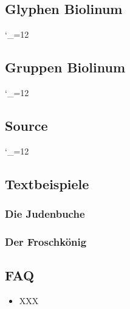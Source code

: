 \documentclass{fontdoku}
\begin{document}
\newpage
\subsection{Glyphen Biolinum}

{%
\setlength{\columnseprule}{.5pt}
\setlength{\columnsep}{1cm}
\begin{multicols}{3}
   \newcommand{\GYLPHNAME}[1]{\sindex[Bglyph]{#1}%
   \makebox[3cm][l]{\hypertarget{bglyph.#1}{}\hyperlink{bgglyph.#1}{#1}}\hfill%
   {\Huge\fbox{\Bglyph{#1}\strut}}\hfill\mbox{}\newline}
   \catcode`\_=12%
\end{multicols}
}


\newpage
\subsection{Gruppen Biolinum}
{\setlength{\columnseprule}{.5pt}
\setlength{\columnsep}{1cm}
\catcode`\_=12%
\newcommand{\GROUPHEAD}[1]{\begin{multicols}{3}[\subsubsection{#1}]}
\newcommand{\GROUPFOOT}{\end{multicols}}
\newcommand{\GROUPGLYPH}[2]{\sindex[Bglyph]{#2}%
   \makebox[3cm][l]{\hyperlink{bglyph.#2}{#2}\hypertarget{bgglyph.#2}{}{ \small(0x#1)}}%
   \hfill{\Huge\Bglyph{#2}\strut}\hfill\mbox{}\newline}
}



\newpage
\subsection{Source}



\newpage
{}
%
{\catcode`\_=12%
\def\indexcolumn{4}%
\printindex[Lglyph]
\printindex[Bglyph]
}
\printindex[idx]

\newpage
\subsection{Textbeispiele}

\subsubsection{Die Judenbuche}
{\color[HTML]{8c0b0b}

}
\newpage
\subsubsection{Der Froschkönig}
{\color[HTML]{8c0b0b}

}

\newpage
\subsection{FAQ}

\begin{itemize}
   \item XXX
\end{itemize}
\end{document}
